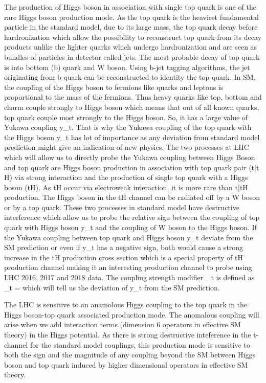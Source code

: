 \documentclass[final,3p]{CSP}
\begin{document}
The production of Higgs boson in association with single top quark is one of the rare Higgs boson production mode. As the top 
quark is the heaviest fundamental particle in the standard model, due to its large mass, the top quark decay before 
hardronization which allow the possibility to reconstruct top quark from its decay products unlike the lighter quarks which 
undergo hardronization and are seen as bundles of particles in detector called jets. The most probable decay of top quark is into 
bottom (b) quark and W boson. Using b-jet tagging algorithms, the jet originating from b-quark can be reconstructed to identity 
the top quark. In SM, the coupling of the Higgs boson to fermions like quarks and leptons is proportional to the mass of the 
fermions. Thus heavy quarks like top, bottom and charm couple strongly to Higgs boson which means that out of all known quarks, 
top quark couple most strongly to the Higgs boson. So, it has a large value of Yukawa coupling y_t. That is why the Yukawa 
coupling of the top quark with the Higgs boson y_t has lot of importance as any deviation from standard model prediction might 
give an indication of new physics. The two processes at LHC which will allow us to directly probe the Yukawa coupling between 
Higgs Boson and top quark are Higgs boson production in association with top quark pair (t\bar{t} H) via strong interaction and 
the production of single top quark with a Higgs boson (tH). As tH occur via electroweak interaction, it is more rare than 
t\bar{t}H production. The Higgs boson in the tH channel can be radiated off by a W boson or by a top quark. These two processes 
in standard model have destructive interference which allow us to probe the relative sign between the coupling of top quark with 
Higgs boson y_t and the coupling of W boson to the Higgs boson. If the Yukawa coupling between top quark and Higgs boson y_t 
deviate from the SM prediction or even if y_t has a negative sign, both would cause a strong increase in the tH production cross 
section which is a special property of tH production channel making it an interesting production channel to probe using LHC 
2016, 2017 and 2018 data. The coupling strength modifier \kappa_t is defined as \kappa_t =  which will tell us the 
deviation of y_t from the SM prediction. 

The LHC is sensitive to an anamolous Higgs coupling to the top quark in the Higgs boson-top quark associated production mode. The 
anomalous coupling will arise when we add interaction terms (dimension 6 operators in effective SM theory) in the Higgs potential. As 
there is strong destructive inteference in the t-channel for the standard model couplings, this production mode is sensitive to both the 
sign and the magnitude of any coupling beyond the SM between Higgs boson and top quark induced by higher dimensional operators in 
effective SM theory.
\end{document}
